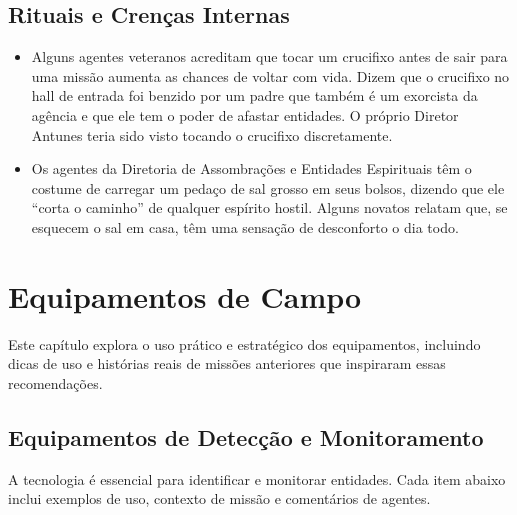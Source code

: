 \documentclass{book}
\begin{document}
\section{Rituais e Crenças Internas}
\begin{itemize}
    \item Alguns agentes veteranos acreditam que tocar um crucifixo antes de sair para uma missão aumenta as chances de voltar com vida. Dizem que o crucifixo no hall de entrada foi benzido por um padre que também é um exorcista da agência e que ele tem o poder de afastar entidades. O próprio Diretor Antunes teria sido visto tocando o crucifixo discretamente.
    \item Os agentes da Diretoria de Assombrações e Entidades Espirituais têm o costume de carregar um pedaço de sal grosso em seus bolsos, dizendo que ele “corta o caminho” de qualquer espírito hostil. Alguns novatos relatam que, se esquecem o sal em casa, têm uma sensação de desconforto o dia todo.
\end{itemize}

\chapter{Equipamentos de Campo}
Este capítulo explora o uso prático e estratégico dos equipamentos, incluindo dicas de uso e histórias reais de missões anteriores que inspiraram essas recomendações.

\section{Equipamentos de Detecção e Monitoramento}
A tecnologia é essencial para identificar e monitorar entidades. Cada item abaixo inclui exemplos de uso, contexto de missão e comentários de agentes.
\end{document}
